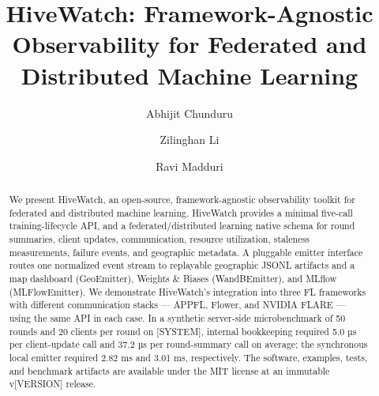 \documentclass[preprint,12pt, a4paper]{elsarticle}
\begin{document}
\begin{frontmatter}



\title{HiveWatch: Framework-Agnostic Observability for Federated and Distributed Machine Learning}


\author[anl,umass]{Abhijit Chunduru}

\author[anl]{Zilinghan Li}

\author[anl,uchicago]{Ravi Madduri}


\address[anl]{Argonne National Laboratory, Lemont, IL, USA}
\address[umass]{University of Massachusetts Amherst, Amherst, MA, USA}
\address[uchicago]{The University of Chicago, Chicago, IL, USA}

\begin{abstract}
We present HiveWatch, an open-source, framework-agnostic observability toolkit for federated and distributed machine learning. HiveWatch provides a minimal five-call training-lifecycle API, and a federated/distributed learning native schema for round summaries, client updates, communication, resource utilization, staleness measurements, failure events, and geographic metadata. A pluggable emitter interface routes one normalized event stream to replayable geographic JSONL artifacts and a map dashboard (GeoEmitter), Weights & Biases (WandBEmitter), and MLflow (MLFlowEmitter). We demonstrate HiveWatch's integration into three FL frameworks with different communication stacks — APPFL, Flower, and NVIDIA FLARE — using the same API in each case. In a synthetic server-side microbenchmark of 50 rounds and 20 clients per round on [SYSTEM], internal bookkeeping required 5.0 µs per client-update call and 37.2 µs per round-summary call on average; the synchronous local emitter required 2.82 ms and 3.01 ms, respectively. The software, examples, tests, and benchmark artifacts are available under the MIT license at an immutable v[VERSION] release.\end{abstract}


\end{frontmatter}
\end{document}
